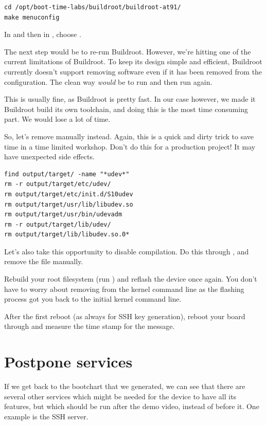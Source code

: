 \begin{verbatim}
cd /opt/boot-time-labs/buildroot/buildroot-at91/
make menuconfig
\end{verbatim}

In  and then in ,
choose .

The next step would be to re-run Buildroot. However, we're hitting one
of the current limitations of Buildroot. To keep its design simple and
efficient, Buildroot currently doesn't support removing software
even if it has been removed from the configuration. The clean way
{\em would} be to run  and then run 
again.

This is usually fine, as Buildroot is pretty fast. In our case however,
we made it Buildroot build its own toolchain, and doing this is the most
time consuming part. We would lose a lot of time.

So, let's remove  manually instead. Again, this is a quick
and dirty trick to save time in a time limited workshop. Don't do this
for a production project! It may have unexpected side effects.

\begin{verbatim}
find output/target/ -name "*udev*"
rm -r output/target/etc/udev/
rm output/target/etc/init.d/S10udev
rm output/target/usr/lib/libudev.so
rm output/target/usr/bin/udevadm
rm -r output/target/lib/udev/
rm output/target/lib/libudev.so.0*
\end{verbatim}

Let's also take this opportunity to disable 
compilation. Do this through , and remove
the  file manually.

Rebuild your root filesystem (run ) and reflash the device once again.
You don't have to worry about removing  from the kernel
command line as the flashing process got you back to the initial kernel
command line.

After the first reboot (as always for SSH key generation), reboot your
board through  and measure the time stamp for the
 message.

\section{Postpone services}

If we get back to the bootchart that we generated, we can see that there
are several other services which might be needed for the device to
have all its features, but which should be run after the demo video,
instead of before it. One example is the SSH server.

